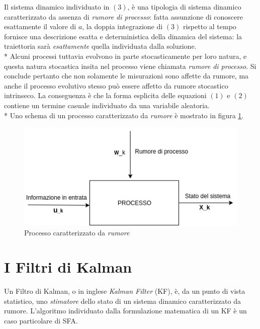 Il sistema dinamico individuato in $(3)$, \`e una tipologia di sistema dinamico caratterizzato da assenza di \emph{rumore di processo}: fatta assunzione di conoscere esattamente il valore di $a$, la doppia integrazione di $(3)$ rispetto al tempo fornisce una descrizione esatta e deterministica della dinamica del sistema: la traiettoria sar\`a \emph{esattamente} quella individuata dalla soluzione.\\*
Alcuni processi tuttavia evolvono in parte stocasticamente per loro natura, e questa natura stocastica insita nel processo viene chiamata \emph{rumore di processo}. Si conclude pertanto che non solamente le misurazioni sono affette da rumore, ma anche il processo evolutivo stesso pu\`o essere affetto da rumore stocastico intrinseco. La conseguenza \`e che la forma esplicita delle equazioni $(1)$ e $(2)$ contiene un termine casuale individuato da una variabile aleatoria.\\*
Uno schema di un processo caratterizzato da \emph{rumore} \`e mostrato in figura \ref{fig:mimo1}.
\begin{figure}[h]
	\centering
	\includegraphics{img/mimo1}
	\caption{Processo caratterizzato da \emph{rumore}}
	\label{fig:mimo1}
\end{figure}
\section{I Filtri di Kalman}
Un Filtro di Kalman, o in inglese \emph{Kalman Filter} (KF), \`e, da un punto di vista statistico, uno \emph{stimatore} dello stato di un sistema dinamico caratterizzato da rumore. L'algoritmo individuato dalla formulazione matematica di un KF \`e un caso particolare di SFA.
